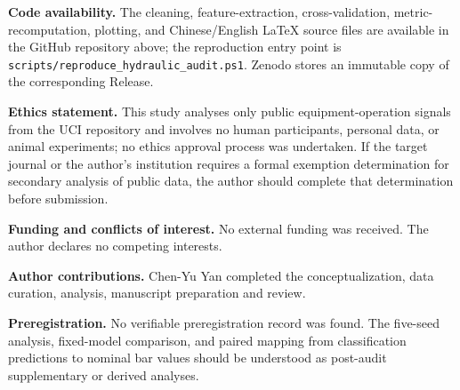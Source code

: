 \documentclass[11pt,a4paper]{article}
\begin{document}
\textbf{Code availability.} The cleaning, feature-extraction, cross-validation, metric-recomputation, plotting, and Chinese/English LaTeX source files are available in the GitHub repository above; the reproduction entry point is \texttt{scripts/reproduce\_hydraulic\_audit.ps1}. Zenodo stores an immutable copy of the corresponding Release.

\textbf{Ethics statement.} This study analyses only public equipment-operation signals from the UCI repository and involves no human participants, personal data, or animal experiments; no ethics approval process was undertaken. If the target journal or the author's institution requires a formal exemption determination for secondary analysis of public data, the author should complete that determination before submission.

\textbf{Funding and conflicts of interest.} No external funding was received. The author declares no competing interests.

\textbf{Author contributions.} Chen-Yu Yan completed the conceptualization, data curation, analysis, manuscript preparation and review.

\textbf{Preregistration.} No verifiable preregistration record was found. The five-seed analysis, fixed-model comparison, and paired mapping from classification predictions to nominal bar values should be understood as post-audit supplementary or derived analyses.
\end{document}
